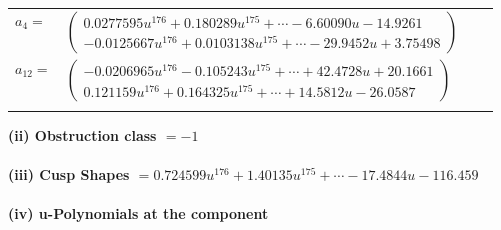 \documentclass[1p]{elsarticle_modified}
\theoremstyle{definition}
\begin{document}
\begin{tabular}{m{7pt} m{180pt} m{7pt} m{180pt} }
\flushright $a_{4}=$&$\begin{pmatrix}0.0277595 u^{176}+0.180289 u^{175}+\cdots-6.60090 u-14.9261\\-0.0125667 u^{176}+0.0103138 u^{175}+\cdots-29.9452 u+3.75498\end{pmatrix}$ \\
\flushright $a_{12}=$&$\begin{pmatrix}-0.0206965 u^{176}-0.105243 u^{175}+\cdots+42.4728 u+20.1661\\0.121159 u^{176}+0.164325 u^{175}+\cdots+14.5812 u-26.0587\end{pmatrix}$\\&\end{tabular}
\flushleft \textbf{(ii) Obstruction class $= -1$}\\~\\
\flushleft \textbf{(iii) Cusp Shapes $= 0.724599 u^{176}+1.40135 u^{175}+\cdots-17.4844 u-116.459$}\\~\\
\newpage\renewcommand{\arraystretch}{1}
\flushleft \textbf{(iv) u-Polynomials at the component}\newline \\
\end{document}
